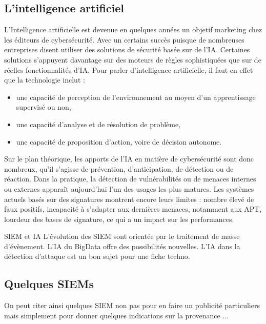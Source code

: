 \subsection{L'intelligence artificiel}


L’Intelligence artificielle est devenue en quelques années un objetif marketing chez les éditeurs de cybersécurité. Avec un certains succès puisque de nombreuses entreprises disent  utiliser des solutions de sécurité basée sur de l’IA. Certaines solutions s’appuyent davantage sur des moteurs de règles sophistiquées que sur de réelles fonctionnalités d’IA. Pour parler d’intelligence artificielle, il faut en effet que la technologie inclut : 

\begin{itemize}
  \item  une capacité de perception de l’environnement au moyen d’un apprentissage supervisé ou non,
  \item  une capacité d’analyse et de résolution de problème, 
  \item   une capacité de proposition d’action, voire de décision autonome.
\end{itemize}

Sur le plan théorique, les apports de l’IA en matière de cybersécurité sont donc nombreux, qu’il s’agisse de prévention, d’anticipation, de détection ou de réaction. Dans la pratique, la détection de vulnérabilités ou de menaces internes ou externes apparaît aujourd’hui l’un des usages les plus matures.  Les systèmes actuels basés sur des signatures montrent encore leurs limites : nombre élevé de faux positifs, incapacité à s’adapter aux dernières menaces, notamment aux APT, lourdeur des bases de signature, ce qui a un impact sur les performances. 

\begin{warningbox}{SIEM et IA}
L'évolution des SIEM sont orientée par le traitement de masse d'évènement. L'IA du BigData offre des possibilités nouvelles.  L'IA dans la détection d'attaque est 	un bon sujet pour une fiche techno.
\end{warningbox}

\subsection{Quelques SIEMs}

On peut citer  ainsi quelques SIEM non pas pour en faire un publicité particuliers mais simplement pour donner quelques indications sur la provenance ...

